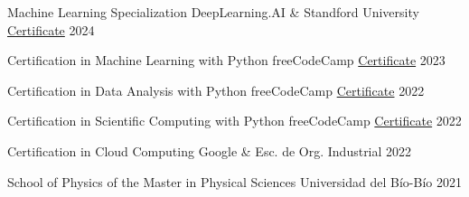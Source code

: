 

\begin{cvhonors}

  \cvhonor
    {Machine Learning Specialization} %
    {DeepLearning.AI \& Standford University} %
    {\href{https://www.coursera.org/account/accomplishments/specialization/9ZUV9TSH2GB6}{Certificate}} %
    {2024} %

  \cvhonor
    {Certification in Machine Learning with Python} %
    {freeCodeCamp} %
    {\href{https://www.freecodecamp.org/certification/_joacoh/machine-learning-with-python-v7}{Certificate}} %
    {2023} %

  \cvhonor
    {Certification in Data Analysis with Python} %
    {freeCodeCamp} %
    {\href{https://freecodecamp.org/certification/_joacoh/data-analysis-with-python-v7}{Certificate}} %
    {2022} %

  \cvhonor
    {Certification in Scientific Computing with Python} %
    {freeCodeCamp} %
    {\href{https://freecodecamp.org/certification/_joacoh/scientific-computing-with-python-v7}{Certificate}} %
    {2022} %

  \cvhonor
    {Certification in Cloud Computing} %
    {Google \& Esc. de Org. Industrial} %
    {} %
    {2022} %

  \cvhonor
    {School of Physics of the Master in Physical Sciences} %
    {Universidad del Bío-Bío} %
    {} %
    {2021} %

\end{cvhonors}
